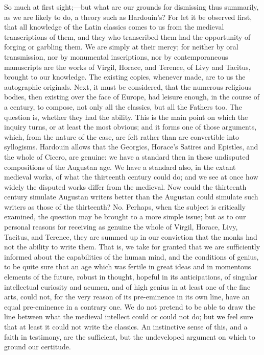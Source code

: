 So much at first sight;—but what are our grounds for dismissing
thus summarily, as we are likely to do, a theory such as Hardouin's?
For let it be observed first, that all knowledge of the Latin classics
comes to us from the medieval transcriptions of them, and they who
transcribed them had the opportunity of forging or garbling them. We
are simply at their mercy; for neither by oral transmission, nor by
monumental inscriptions, nor by contemporaneous manuscripts are the
works of Virgil, Horace, and Terence, of Livy and Tacitus, brought to
our knowledge. The existing copies, whenever made, are to us the
autographic originals. Next, it must be considered, that the numerous
religious bodies, then existing over the face of Europe, had leisure
enough, in the course of a century, to compose, not only all the
classics, but all the Fathers too. The question is, whether they had
the ability. This is the main point on which the inquiry turns, or at
least the most obvious; and it forms one of those arguments, which,
from the nature of the case, are felt rather than are convertible into
syllogisms. Hardouin allows that the Georgics, Horace's Satires and
Epistles, and the whole of Cicero, are genuine: we have a standard
then in these undisputed compositions of the Augustan age. We have a
standard also, in the extant medieval works, of what the thirteenth
century could do; and we see at once how widely the disputed works
differ from the medieval. Now could the thirteenth century simulate
Augustan writers better than the Augustan could simulate such writers
as those of the thirteenth? No. Perhaps, when the subject is
critically examined, the question may be brought to a more simple
issue; but as to our personal reasons for receiving as genuine the
whole of Virgil, Horace, Livy, Tacitus, and Terence, they are summed
up in our conviction that the monks had not the ability to write them.
That is, we take for granted that we are sufficiently informed about
the capabilities of the human mind, and the conditions of genius, to
be quite sure that an age which was fertile in great ideas and in
momentous elements of the future, robust in thought, hopeful in its
anticipations, of singular intellectual curiosity and acumen,
and of high genius in at least one of the fine arts, could not, for
the very reason of its pre-eminence in its own line, have an equal
pre-eminence in a contrary one. We do not pretend to be able to draw
the line between what the medieval intellect could or could not do;
but we feel sure that at least it could not write the classics. An
instinctive sense of this, and a faith in testimony, are the
sufficient, but the undeveloped argument on which to ground our
certitude.

